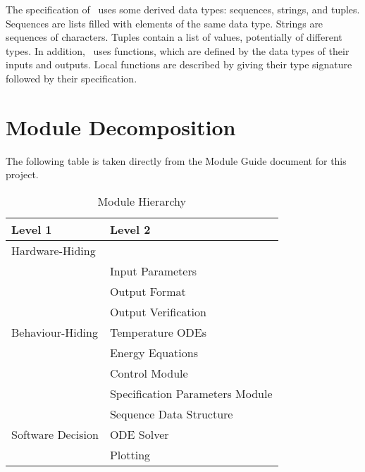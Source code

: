 \documentclass[12pt, titlepage]{article}
\begin{document}
\noindent
The specification of \progname \ uses some derived data types: sequences, strings, and
tuples. Sequences are lists filled with elements of the same data type. Strings
are sequences of characters. Tuples contain a list of values, potentially of
different types. In addition, \progname \ uses functions, which
are defined by the data types of their inputs and outputs. Local functions are
described by giving their type signature followed by their specification.

\section{Module Decomposition}

The following table is taken directly from the Module Guide document for this project.

\begin{table}[h!]
	\centering
	\begin{tabular}{p{} p{}}
		\toprule
		\textbf{Level 1}                               & \textbf{Level 2}                \\
		\midrule

		{Hardware-Hiding}                              & ~                               \\
		\midrule

		\multirow{7}{0.3\textwidth}{Behaviour-Hiding}  & Input Parameters                \\
		                                               & Output Format                   \\
		                                               & Output Verification             \\
		                                               & Temperature ODEs                \\
		                                               & Energy Equations                \\
		                                               & Control Module                  \\
		                                               & Specification Parameters Module \\
		\midrule

		\multirow{3}{0.3\textwidth}{Software Decision} & {Sequence Data Structure}       \\
		                                               & ODE Solver                      \\
		                                               & Plotting                        \\
		\bottomrule

	\end{tabular}
	\caption{Module Hierarchy}
	\label{TblMH}
\end{table}
\end{document}
